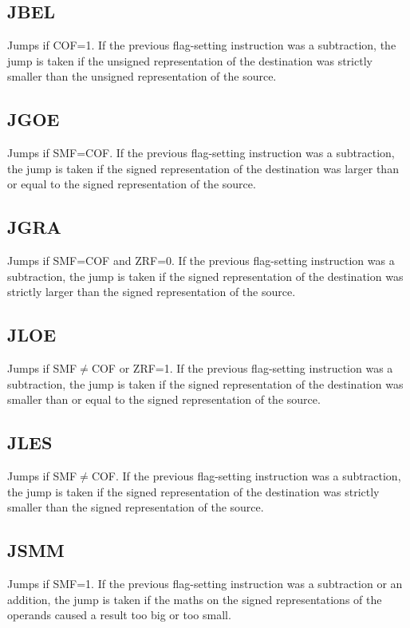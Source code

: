 \documentclass[12pt,a4paper]{report}
\begin{document}
\subsection*{JBEL}
Jumps if COF=1. If the previous flag-setting instruction was a subtraction, the jump is taken if the unsigned representation of the destination was strictly smaller than the unsigned representation of the source.

\subsection*{JGOE}
Jumps if SMF=COF. If the previous flag-setting instruction was a subtraction, the jump is taken if the signed representation of the destination was larger than or equal to the signed representation of the source.

\subsection*{JGRA}
Jumps if SMF=COF and ZRF=0. If the previous flag-setting instruction was a subtraction, the jump is taken if the signed representation of the destination was strictly larger than the signed representation of the source.

\subsection*{JLOE}
Jumps if SMF$\neq$COF or ZRF=1. If the previous flag-setting instruction was a subtraction, the jump is taken if the signed representation of the destination was smaller than or equal to the signed representation of the source.

\subsection*{JLES}
Jumps if SMF$\neq$COF. If the previous flag-setting instruction was a subtraction, the jump is taken if the signed representation of the destination was strictly smaller than the signed representation of the source.

\subsection*{JSMM}
Jumps if SMF=1. If the previous flag-setting instruction was a subtraction or an addition, the jump is taken if the maths on the signed representations of the operands caused a result too big or too small.
\end{document}
